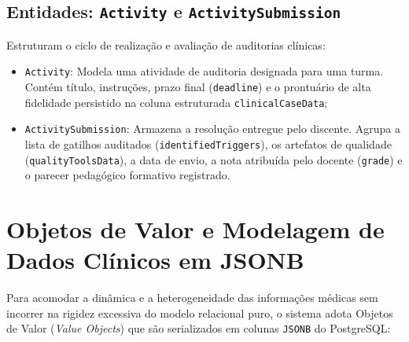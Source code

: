 \subsection{Entidades: \texttt{Activity} e \texttt{ActivitySubmission}}
Estruturam o ciclo de realização e avaliação de auditorias clínicas:
\begin{itemize}
    \item \texttt{Activity}: Modela uma atividade de auditoria designada para uma turma. Contém título, instruções, prazo final (\texttt{deadline}) e o prontuário de alta fidelidade persistido na coluna estruturada \texttt{clinicalCaseData};
    \item \texttt{ActivitySubmission}: Armazena a resolução entregue pelo discente. Agrupa a lista de gatilhos auditados (\texttt{identifiedTriggers}), os artefatos de qualidade (\texttt{qualityToolsData}), a data de envio, a nota atribuída pelo docente (\texttt{grade}) e o parecer pedagógico formativo registrado.
\end{itemize}

\section{Objetos de Valor e Modelagem de Dados Clínicos em JSONB}
\label{sec_value_objects_json}

Para acomodar a dinâmica e a heterogeneidade das informações médicas sem incorrer na rigidez excessiva do modelo relacional puro, o sistema adota Objetos de Valor (\textit{Value Objects}) que são serializados em colunas \texttt{JSONB} do PostgreSQL:

